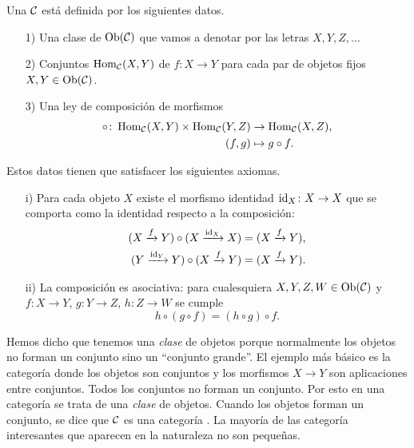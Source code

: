 \documentclass{article}
\numberwithin{equation}{section}
\theoremstyle{definition}
\begin{document}
\begin{definicion}
  Una  $\mathcal{C}$ está definida por los siguientes datos.

  \begin{enumerate}
  \item[1)] Una clase de  $\operatorname{Ob} (\mathcal{C})$ que vamos a denotar
    por las letras $X, Y, Z, \ldots$

  \item[2)] Conjuntos $\operatorname{Hom}_\mathcal{C} (X,Y)$ de 
    $f\colon X\to Y$ para cada par de objetos fijos $X, Y\in \operatorname{Ob} (\mathcal{C})$.

  \item[3)] Una ley de composición de morfismos
    \begin{align*}
      \circ\colon \operatorname{Hom}_\mathcal{C} (X,Y) \times \operatorname{Hom}_\mathcal{C} (Y,Z) & \to \operatorname{Hom}_\mathcal{C} (X,Z),\\
      (f, g) & \mapsto g\circ f.
    \end{align*}
  \end{enumerate}

  Estos datos tienen que satisfacer los siguientes axiomas.

  \begin{enumerate}
  \item[i)] Para cada objeto $X$ existe el morfismo identidad
    $\mathrm{id}_{X}\colon X\to X$ que se comporta como la identidad respecto a la
    composición:
    \begin{align*}
      (X\xrightarrow{f} Y)\circ (X\xrightarrow{\mathrm{id}_{X}} X) & = (X\xrightarrow{f} Y),\\
      (Y\xrightarrow{\mathrm{id}_{Y}} Y) \circ (X\xrightarrow{f} Y) & = (X\xrightarrow{f} Y).
    \end{align*}

  \item[ii)] La composición es asociativa: para cualesquiera
    $X,Y,Z,W\in\operatorname{Ob} (\mathcal{C})$ y $f\colon X\to Y$, $g\colon Y\to Z$,
    $h\colon Z\to W$ se cumple
    $$h\circ (g\circ f) = (h\circ g)\circ f.$$
  \end{enumerate}
\end{definicion}

\begin{comentario}
  \label{comentario:clases-y-categorias-pequenas}
  Hemos dicho que tenemos una \emph{clase} de objetos porque normalmente los
  objetos no forman un conjunto sino un ``conjunto grande''. El ejemplo más
  básico es la categoría donde los objetos son conjuntos y los morfismos
  $X\to Y$ son aplicaciones entre conjuntos. Todos los conjuntos no forman un
  conjunto. Por esto en una categoría se trata de una \emph{clase} de
  objetos. Cuando los objetos forman un conjunto, se dice que $\mathcal{C}$ es
  una categoría . La mayoría de las categoría interesantes que
  aparecen en la naturaleza no son pequeñas.
\end{comentario}
\end{document}
